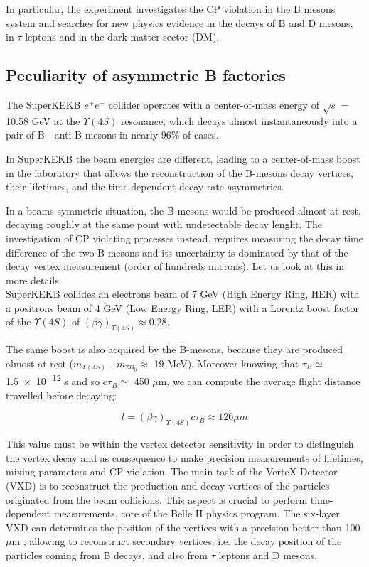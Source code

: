 In particular, the experiment investigates the CP violation in the B mesons system and searches for new physics evidence in the decays of B and D mesons, in $\tau$ leptons and in the dark matter sector (DM).


\subsection{Peculiarity of asymmetric B factories} \label{sec:vertex_decay}

The SuperKEKB $e^{+}e^{-}$ collider operates with a center-of-mass energy of $\sqrt{s}$ = 10.58 GeV at the $\Upsilon(4S)$ resonance, which decays almost instantaneously into a pair of B - anti B mesons in nearly 96\% of cases. 

In SuperKEKB the beam energies are different, leading to a center-of-mass boost in the laboratory that allows the reconstruction of the B-mesons decay vertices, their lifetimes, and the time-dependent decay rate asymmetries.

In a beams symmetric situation, the B-mesons would be produced almost at rest, decaying roughly at the same point with undetectable decay lenght. 
The investigation of CP violating processes instead, requires measuring the decay time difference of the two B mesons and its uncertainty is dominated by that of the decay vertex measurement (order of hundreds microns). Let us look at this in more details.\\

SuperKEKB collides an electrons beam of 7 GeV (High Energy Ring, HER) with a positrons beam of 4 GeV (Low Energy Ring, LER) with a Lorentz boost factor of the $\Upsilon(4S)$ of $(\beta\gamma)_{\Upsilon(4S)} \approx 0.28 $.

The same boost is also acquired by the B-mesons, because they are produced almost at rest ($m_{\Upsilon(4S)}$ - $m_{2B_{0}}\approx$ 19 MeV). Moreover knowing that $\tau_{B}\simeq $\num{1.5e-12} s and so c$\tau_{B}\simeq$ 450 $\mu$m, we can compute the average flight distance travelled before decaying:

\begin{equation}
\textit{l} = (\beta\gamma)_{\Upsilon(4S)}c\tau_{B} \approx 126 \mu m  
\end{equation} 

This value must be within the vertex detector sensitivity in order to distinguish the vertex decay and as consequence to make precision measurements of lifetimes, mixing parameters and CP violation. 
The main task of the VerteX Detector (VXD) is to reconstruct the production and decay vertices of the particles originated from the beam collisions. This aspect is crucial to perform time-dependent measurements, core of the Belle II physics program. The six-layer VXD can determines the position of the vertices with a precision better than 100 $\mu$m \cite{Belle-II:2010dht}, allowing to reconstruct secondary vertices, i.e. the decay position of the particles coming from B decays, and also from $\tau$ leptons and D mesons.

